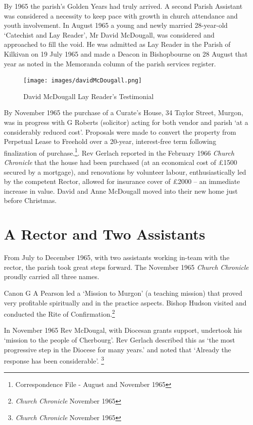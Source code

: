 By 1965 the parish's Golden Years had truly arrived. A second Parish
Assistant was considered a necessity to keep pace with growth in church
attendance and youth involvement. In August 1965 a young and newly
married 28-year-old `Catechist and Lay Reader', Mr David McDougall, was
considered and approached to fill the void. He was admitted as Lay
Reader in the Parish of Kilkivan on 19 July 1965 and made a Deacon in
Bishopbourne on 28 August that year as noted in the Memoranda column of
the parish services register.




\begin{figure}[!h]
\begin{center}
\texttt{[image: images/davidMcDougall.png]}
\caption{David McDougall Lay Reader's Testimonial}
\end{center}
\end{figure}


By November 1965 the purchase of a Curate's House, 34 Taylor Street,
Murgon, was in progress with G Roberts (solicitor) acting for both
vendor and parish `at a considerably reduced cost'. Proposals were made
to convert the property from Perpetual Lease to Freehold over a 20-year,
interest-free term following finalization of purchase.\footnote{Correspondence
  File - August and November 1965}. Rev Gerlach reported in the February
1966 \emph{Church Chronicle} that the house had been purchased (at an
economical cost of \pounds1500 secured by a mortgage), and renovations by
volunteer labour, enthusiastically led by the competent Rector, allowed
for insurance cover of \pounds2000 -- an immediate increase in value. David
and Anne McDougall moved into their new home just before Christmas.

\section{A Rector and Two
Assistants}

From July to December 1965, with two assistants working in-team with the
rector, the parish took great steps forward. The November 1965
\emph{Church Chronicle} proudly carried all three names.

Canon G A Pearson led a `Mission to Murgon' (a teaching mission) that
proved very profitable spiritually and in the practice aspects. Bishop
Hudson visited and conducted the Rite of Confirmation.\footnote{\emph{Church
  Chronicle} November 1965}

In November 1965 Rev McDougal, with Diocesan grants support, undertook
his `mission to the people of Cherbourg'. Rev Gerlach described this as
`the most progressive step in the Diocese for many years.' and noted
that `Already the response has been considerable'. \footnote{\emph{Church
  Chronicle} November 1965}

